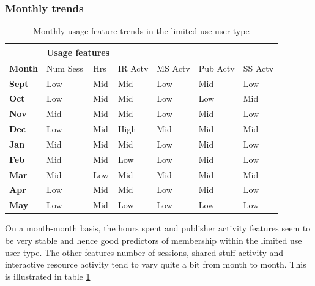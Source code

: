 \documentclass{acm_proc_article-sp}
\begin{document}
\subsubsection{Monthly trends}
\begin{table}
\label{cluster0month}
\caption{Monthly usage feature trends in the limited use user type}
\begin{tabular}{|p{1.5cm}|p{0.6cm}|p{0.6cm}|p{0.6cm}|p{0.6cm}|p{0.8cm}|p{0.8cm}|}
& \multicolumn{2}{r}{\textbf{Usage features}}  \\ \hline
 \textbf{Month} 
 & Num Sess & Hrs & IR Actv & MS Actv & Pub Actv & SS Actv \\ \hline
\textbf{Sept} & Low                                    & Mid   & Mid         & Low             & Mid            & Low                 \\  \hline
\textbf{Oct}   & Low                                    & Mid   & Mid         & Low             & Low            & Mid                 \\  \hline
\textbf{Nov}  & Mid                                    & Mid   & Mid         & Low             & Mid            & Low                 \\  \hline
\textbf{Dec}  & Low                                    & Mid   & High        & Mid             & Mid            & Mid                 \\  \hline
\textbf{Jan}   & Mid                                    & Mid   & Mid         & Low             & Mid            & Low                 \\ \hline
\textbf{Feb}  & Mid                                    & Mid   & Low         & Low             & Mid            & Low                 \\  \hline
\textbf{Mar}     & Mid                                    & Low   & Mid         & Mid             & Mid            & Mid                 \\ \hline
\textbf{Apr}     & Low                                    & Mid   & Mid         & Low             & Mid            & Low                 \\ \hline
\textbf{May}       & Low                                    & Mid   & Low         & Low             & Low            &   Low              \\ \hline   
\end{tabular}
\end{table}
On a month-month basis, the hours spent and publisher activity features seem to be very stable and hence good predictors of membership within the limited use user type. The other features number of sessions, shared stuff activity and  interactive resource activity tend to vary quite a bit from month to month. This is illustrated in table \ref{cluster0month}
\end{document}
